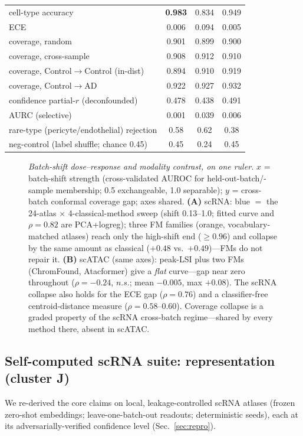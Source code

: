 \documentclass[journal]{IEEEtran}
\begin{document}
\begin{table}[!ht]
{\begin{tabular}{@{}lccc@{}}
cell-type accuracy & \textbf{0.983} & 0.834 & 0.949 \\
ECE & 0.006 & 0.094 & 0.005 \\
coverage, random & 0.901 & 0.899 & 0.900 \\
coverage, cross-sample & 0.908 & 0.912 & 0.910 \\
coverage, Control$\to$Control (in-dist) & 0.894 & 0.910 & 0.919 \\
coverage, Control$\to$AD & 0.922 & 0.927 & 0.932 \\
confidence partial-$r$ (deconfounded) & 0.478 & 0.438 & 0.491 \\
AURC (selective) & 0.001 & 0.039 & 0.006 \\
rare-type (pericyte/endothelial) rejection & 0.58 & 0.62 & 0.38 \\
neg-control (label shuffle; chance 0.45) & 0.45 & 0.24 & 0.45 \\
\bottomrule
\end{tabular}}
\end{table}

\begin{figure}[!tbp]\centering
\resizebox{\textwidth}{!}{}
\caption{\emph{Batch-shift dose--response and modality contrast, on one ruler.} $x$ = batch-shift strength (cross-validated AUROC for held-out-batch/-sample membership; 0.5 exchangeable, 1.0 separable); $y$ = cross-batch conformal coverage gap; axes shared. \textbf{(A)} scRNA: blue $=$ the 24-atlas $\times$ 4-classical-method sweep (shift 0.13--1.0; fitted curve and $\rho=0.82$ are PCA+logreg); three FM families (orange, vocabulary-matched atlases) reach only the high-shift end ($\ge 0.96$) and collapse by the same amount as classical ($+0.48$ vs.\ $+0.49$)---FMs do not repair it. \textbf{(B)} scATAC (same axes): peak-LSI plus two FMs (ChromFound, Atacformer) give a \emph{flat} curve---gap near zero throughout ($\rho=-0.24$, $n.s.$; mean $-0.005$, max $+0.08$). The scRNA collapse also holds for the ECE gap ($\rho=0.76$) and a classifier-free centroid-distance measure ($\rho=0.58$--$0.60$). Coverage collapse is a graded property of the scRNA cross-batch regime---shared by every method there, absent in scATAC.}\label{fig:batchdose}\end{figure}

\subsection{Self-computed scRNA suite: representation (cluster J)}
We re-derived the core claims on local, leakage-controlled scRNA atlases (frozen zero-shot embeddings; leave-one-batch-out readouts; deterministic seeds), each at its adversarially-verified confidence level (Sec.~\ref{sec:repro}).
\end{document}
